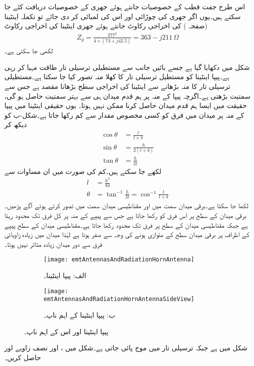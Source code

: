 اس طرح جفت قطب کے خصوصیات جانتے ہوئے جھری کے خصوصیات دریافت کئے جا سکتے ہیں۔یوں اگر جھری کی چوڑائی  اور اس کی لمبائی  کر دی جائے تو تکملہ اینٹینا (صفحہ ) کی اخراجی رکاوٹ   جانتے ہوئے جھری اینٹینا کی اخراجی رکاوٹ
\begin{align}
Z_g=\frac{377^2}{4 \times (73+j42.5)}=363-j 211 \, \Omega
\end{align}
لکھی جا سکتی ہے۔

شکل  میں  دکھایا گیا ہے جسے بائیں جانب سے مستطیلی ترسیلی تار طاقت مہیا کر رہی ہے۔پیپا اینٹینا کو مستطیل ترسیلی تار کا کھلا منہ تصور کیا جا سکتا ہے۔مستطیلی ترسیلی تار کا منہ بڑھانے سے اینٹینا کی اخراجی سطح بڑھانا مقصد ہے جس سے سمتیت بڑھتی ہے۔اگرچہ پیپا کے منہ پر ہم قدم میدان ہی سے بہتر سمتیت حاصل ہو گی، حقیقت میں ایسا ہم قدم میدان حاصل کرنا ممکن نہیں ہوتا۔ یوں حقیقی اینٹینا میں پیپا کے منہ پر میدان میں فرق کو کسی مخصوص مقدار  سے کم رکھا جاتا ہے۔شکل-ب کو دیکھ کر
  \begin{align*}
\cos \theta&=\frac{l}{l+\delta}\\
\sin \theta&=\frac{h}{2(l+\delta)}\\
\tan \theta&=\frac{h}{2l}
\end{align*}
لکھے جا سکتے ہیں۔کم  کی صورت میں ان مساوات سے
\begin{align}
l&=\frac{h^2}{8 \delta}\\
\theta&=\tan^{-1} \frac{h}{2l}=\cos^{-1}\frac{l}{l+\delta}
\end{align}
لکھا جا سکتا ہے۔برقی میدان  سمت میں اور مقناطیسی میدان  سمت میں تصور کرتے ہوئے آگے پڑھیں۔برقی میدان  کے سطح پر اس فرق کو  رکھا جاتا ہے جس سے پیپے کے منہ پر کل فرق  تک محدود رہتا ہے جبکہ مقناطیسی میدان  کے سطح  پر فرق  تک محدود رکھا جاتا ہے۔مقناطیسی میدان کے سطح پیپے کے اطراف پر برقی میدان سطح کے متوازی ہونے کی وجہ سے صفر ہوتا ہے لہٰذا میدان میں زیادہ زاویائی فرق سے دور میدان زیادہ متاثر نہیں ہوتا۔

\begin{figure}
\centering
\begin{subfigure}{0.5\textwidth}
\centering
\texttt{[image: emtAntennasAndRadiationHornAntenna]}
\caption*{الف: پیپا اینٹینا۔}
\end{subfigure}%
%
\begin{subfigure}{0.5\textwidth}
\centering
\texttt{[image: emtAntennasAndRadiationHornAntennaSideView]}
\caption*{ب: پیپا اینٹینا کے اہم ناپ۔}
\end{subfigure}%
\caption{پیپا اینٹینا اور اس کے اہم ناپ۔}
\label{شکل_اینٹینا_پیپا_اینٹینا}
\end{figure}
شکل میں  ہے جبکہ ترسیلی تار میں  موج پائی جاتی ہے۔شکل میں ،  اور نصف زاویے  اور  حاصل کریں۔

